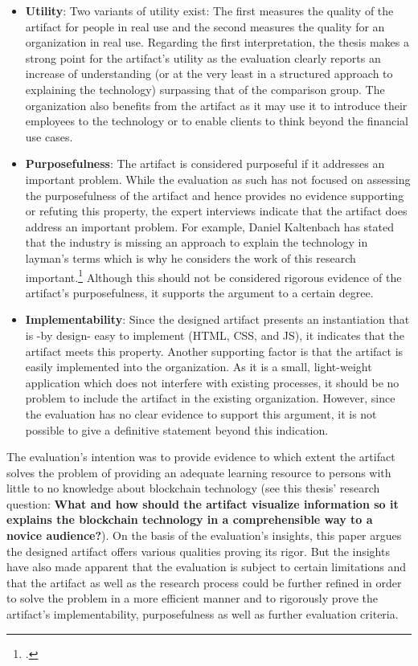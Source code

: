 \begin{itemize}
    \item \textbf{Utility}: Two variants of utility exist: The first measures the quality of the artifact for people in real use and the second measures the quality for an organization in real use. Regarding the first interpretation, the thesis makes a strong point for the artifact's utility as the evaluation clearly reports an increase of understanding (or at the very least in a structured approach to explaining the technology) surpassing that of the comparison group. The organization also benefits from the artifact as it may use it to introduce their employees to the technology or to enable clients to think beyond the financial use cases.
    \item \textbf{Purposefulness}: The artifact is considered purposeful if it addresses an important problem. While the evaluation as such has not focused on assessing the purposefulness of the artifact and hence provides no evidence supporting or refuting this property, the expert interviews indicate that the artifact does address an important problem. For example, Daniel Kaltenbach has stated that the industry is missing an approach to explain the technology in layman's terms which is why he considers the work of this research important.\footcites[Cf.][]{DanielKaltenbach_Interview} Although this should not be considered rigorous evidence of the artifact's purposefulness, it supports the argument to a certain degree.
    \item \textbf{Implementability}: Since the designed artifact presents an instantiation that is -by design- easy to implement (HTML, CSS, and JS), it indicates that the artifact meets this property. Another supporting factor is that the artifact is easily implemented into the organization. As it is a small, light-weight application which does not interfere with existing processes, it should be no problem to include the artifact in the existing organization. However, since the evaluation has no clear evidence to support this argument, it is not possible to give a definitive statement beyond this indication.
\end{itemize}

The evaluation's intention was to provide evidence to which extent the artifact solves the problem of providing an adequate learning resource to persons with little to no knowledge about blockchain technology (see this thesis' research question: \textbf{What and how should the artifact visualize information so it explains the blockchain technology in a comprehensible way to a novice audience?}).
On the basis of the evaluation's insights, this paper argues the designed artifact offers various qualities proving its rigor. But the insights have also made apparent that the evaluation is subject to certain limitations and that the artifact as well as the research process could be further refined in order to solve the problem in a more efficient manner and to rigorously prove the artifact's implementability, purposefulness as well as further evaluation criteria. 

